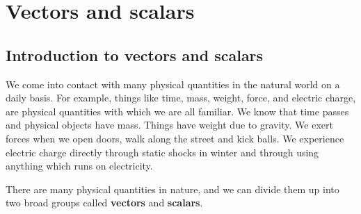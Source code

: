          \chapter{Vectors and scalars}\label{chap:vectors}
    \setcounter{figure}{1}
    \setcounter{subfigure}{1}
    \label{59e414b70efc194a27a122db47d06ce6}
         \section{Introduction to vectors and scalars}
    \nopagebreak
We come into contact with many physical quantities in the natural world on a daily basis. For example, things like time, mass, weight, force, and electric charge, are physical quantities with which we are all familiar. We know that time passes and physical objects have mass. Things have weight due to gravity. We exert forces when we open doors, walk along the street and kick balls. We experience electric charge directly through static shocks in winter and through using anything which runs on electricity. 

There are many physical quantities in nature, and we can divide them up into two broad groups called \textbf{vectors} and \textbf{scalars}.

